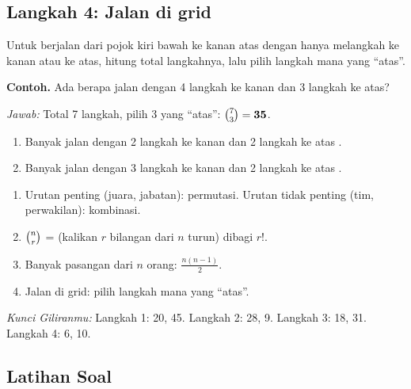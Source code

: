 \documentclass[11pt,a4paper]{article}
\begin{document}
\subsection*{Langkah 4: Jalan di grid}
Untuk berjalan dari pojok kiri bawah ke kanan atas dengan hanya melangkah ke kanan atau ke atas,
hitung total langkahnya, lalu pilih langkah mana yang ``atas''.

\begin{contoh}
\textbf{Contoh.} Ada berapa jalan dengan 4 langkah ke kanan dan 3 langkah ke atas?

\textit{Jawab:} Total 7 langkah, pilih 3 yang ``atas'': $\binom{7}{3} = \textbf{35}$.
\end{contoh}

\begin{giliranmu}
\begin{enumerate}[label=\alph*.]
    \item Banyak jalan dengan 2 langkah ke kanan dan 2 langkah ke atas \kosong.
    \item Banyak jalan dengan 3 langkah ke kanan dan 2 langkah ke atas \kosong.
\end{enumerate}
\end{giliranmu}

\begin{rangkuman}
\begin{enumerate}
    \item Urutan penting (juara, jabatan): permutasi. Urutan tidak penting (tim, perwakilan): kombinasi.
    \item $\binom{n}{r}$ = (kalikan $r$ bilangan dari $n$ turun) dibagi $r!$.
    \item Banyak pasangan dari $n$ orang: $\frac{n(n-1)}{2}$.
    \item Jalan di grid: pilih langkah mana yang ``atas''.
\end{enumerate}
\end{rangkuman}

\textit{Kunci Giliranmu:} Langkah 1: 20, 45. \quad Langkah 2: 28, 9. \quad Langkah 3: 18, 31.
\quad Langkah 4: 6, 10.

\newpage
\subsection*{Latihan Soal}
\end{document}

